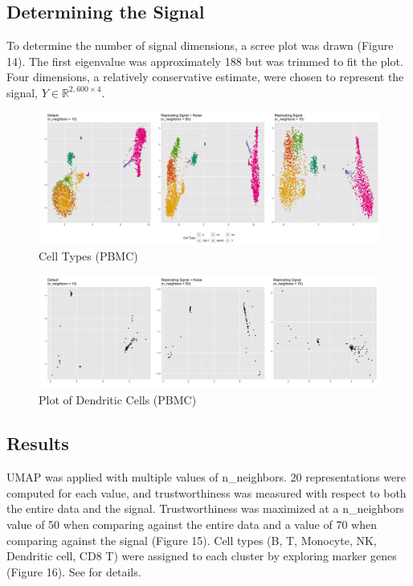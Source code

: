 \documentclass{article}
\begin{document}
\subsection{Determining the Signal}
To determine the number of signal dimensions, a scree plot was drawn (Figure 14). The first eigenvalue was approximately 188 but was trimmed to fit the plot. Four dimensions, a relatively conservative estimate, were chosen to represent the signal, $Y \in \mathbb{R}^{2,600 \times 4}$.

\renewcommand{\thefigure}{16}
\begin{figure}[b]
\includegraphics[scale=0.22]{BPCells_cell_types}
\centering
\caption{Cell Types (PBMC)}
\end{figure}

\renewcommand{\thefigure}{17}
\begin{figure}[t]
\includegraphics[scale=0.22]{DC}
\centering
\caption{Plot of Dendritic Cells (PBMC)}
\end{figure}

\subsection{Results}
UMAP was applied with multiple values of n\_neighbors. 20 representations were computed for each value, and trustworthiness was measured with respect to both the entire data and the signal. Trustworthiness was maximized at a n\_neighbors value of 50 when comparing against the entire data and a value of 70 when comparing against the signal (Figure 15). Cell types (B, T, Monocyte, NK, Dendritic cell, CD8 T) were assigned to each cluster by exploring marker genes (Figure 16). See \cite{BPCells tutorial} for details.
\end{document}
